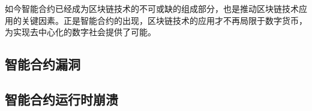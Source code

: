 如今智能合约已经成为区块链技术的不可或缺的组成部分，也是推动区块链技术应用的关键因素。正是智能合约的出现，区块链技术的应用才不再局限于数字货币，为实现去中心化的数字社会提供了可能。
\subsection{智能合约漏洞}

\subsection{智能合约运行时崩溃}




